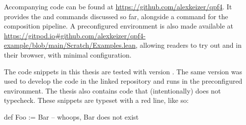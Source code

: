 Accompanying code can be found at \url{https://github.com/alexkeizer/qpf4}.
It provides the \data{} and \codata{} commands discussed so far, alongside a \qpf{} command for the composition
pipeline. A preconfigured environment is also made available at \url{https://gitpod.io#github.com/alexkeizer/qpf4-example/blob/main/Scratch/Examples.lean}, 
allowing readers to try out \data{} and \codata{} in their browser, with minimal configuration.

The code snippets in this thesis are tested with version . The same version was used to develop the code in the linked repository and runs in the preconfigured environment.
The thesis also contains code that (intentionally) does not typecheck. These snippets are typeset with a red line, like so:
\begin{badleancode}

    def Foo := Bar -- whoops, Bar does not exist

\end{badleancode}